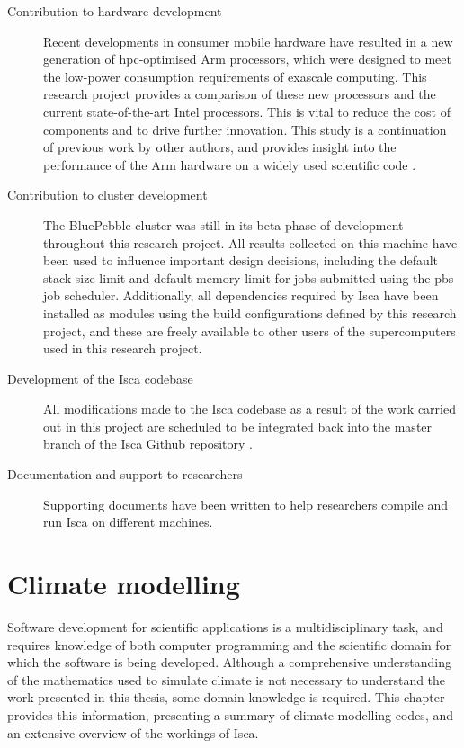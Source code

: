 \documentclass[a4paper,11pt]{report}
\begin{document}
\begin{description}
	\item[Contribution to hardware development] Recent developments in consumer mobile hardware have resulted in a new generation of \gls{hpc}-optimised Arm processors, which were designed to meet the low-power consumption requirements of exascale computing. This research project provides a comparison of these new processors and the current state-of-the-art Intel processors. This is vital to reduce the cost of components and to drive further innovation. This study is a continuation of previous work by other authors, and provides insight into the performance of the Arm hardware on a widely used scientific code \cite{mcintosh2018performance}.
	
	\item[Contribution to cluster development] The BluePebble cluster was still in its beta phase of development throughout this research project. All results collected on this machine have been used to influence important design decisions, including the default stack size limit and default memory limit for jobs submitted using the \gls{pbs} job scheduler. Additionally, all dependencies required by Isca have been installed as modules using the build configurations defined by this research project, and these are freely available to other users of the supercomputers used in this research project. 
	
	\item[Development of the Isca codebase] All modifications made to the Isca codebase as a result of the work carried out in this project are scheduled to be integrated back into the master branch of the Isca Github repository \cite{isca2019github}. 
	
	\item[Documentation and support to researchers] Supporting documents have been written to help researchers compile and run Isca on different machines.
	
\end{description}

\chapter{Climate modelling}
\label{chap:background}
Software development for scientific applications is a multidisciplinary task, and requires knowledge of both computer programming and the scientific domain for which the software is being developed. Although a comprehensive understanding of the mathematics used to simulate climate is not necessary to understand the work presented in this thesis, some domain knowledge is required. This chapter provides this information, presenting a summary of climate modelling codes, and an extensive overview of the workings of Isca.
\end{document}
